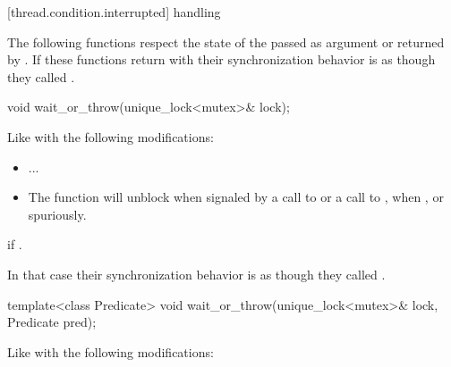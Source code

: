 \begin{codeblock}
\end{codeblock}
{\color{insertcolor}

[thread.condition.interrupted]{ handling}

The following functions respect the state of the 
passed as argument or returned by .
If these functions return with 
their synchronization behavior is as though they called .



%
\begin{itemdecl}
void wait_or_throw(unique_lock<mutex>& lock);
\end{itemdecl}
\begin{itemdescr}
  \pnum\effects Like  with the following modifications:
  \begin{itemize}
    \item ...
    \item The function will unblock when signaled by a call to 
          or a call to ,
          when ,
          or spuriously.
  \end{itemize}

  \pnum\throws {} if .

  \pnum\sync In that case their synchronization behavior is as though they called .
\end{itemdescr}


%
\begin{itemdecl}
template<class Predicate>
  void wait_or_throw(unique_lock<mutex>& lock, Predicate pred);
\end{itemdecl}
\begin{itemdescr}
  \pnum\effects Like  with the following modifications:
  

\end{itemdescr}}
